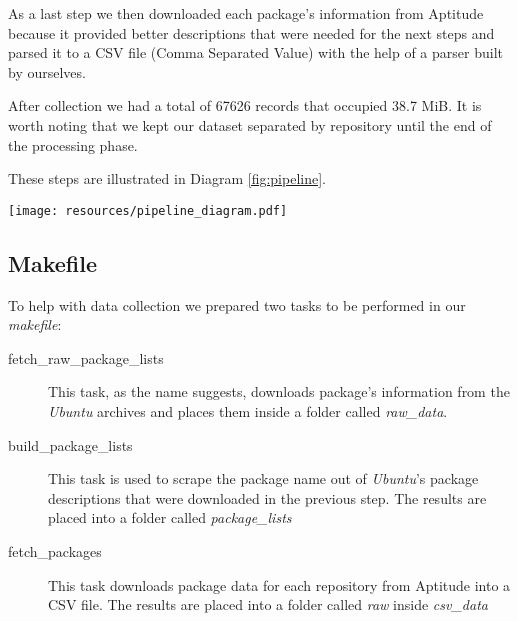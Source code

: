 As a last step we then downloaded each package's information from Aptitude because it provided better descriptions that were needed for the next steps and parsed it to a CSV file (Comma Separated Value) with the help of a parser built by ourselves.

After collection we had a total of 67626 records that occupied 38.7 MiB. It is worth noting that we kept our dataset separated by repository until the end of the processing phase.

These steps are illustrated in Diagram  \ref{fig:pipeline}.

\begin{figure*}[]
\centering
  \texttt{[image: resources/pipeline\_diagram.pdf]}
  \label{fig:pipeline}
  \caption{Pipeline}
\end{figure*}

\subsection{Makefile}

To help with data collection we prepared two tasks to be performed in our \textit{makefile}:

\begin{description}
    \item[fetch\_raw\_package\_lists] This task, as the name suggests, downloads package's information from the \emph{Ubuntu} archives and places them inside a folder called \textit{raw\_data}.
    
    \item[build\_package\_lists] This task is used to scrape the package name out of \emph{Ubuntu}'s package descriptions that were downloaded in the previous step. The results are placed into a folder called \textit{package\_lists}
    
    \item[fetch\_packages] This task downloads package data for each repository from Aptitude into a CSV file. The results are placed into a folder called \textit{raw} inside \textit{csv\_data}
\end{description}